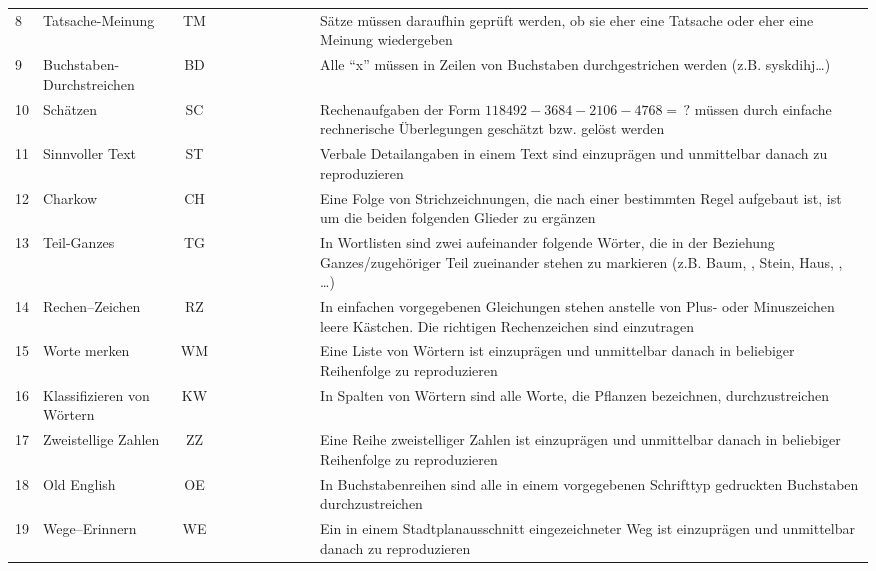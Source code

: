 \documentclass[11pt, twoside, a4paper]{book}		%
\begin{document}
\begin{sidewaystable}
\begin{adjustbox}{width=\textwidth,totalheight=.9\textheight,keepaspectratio}
\begin{threeparttable}
\begin{tabular}{l l c c c c p{.0001cm} c c c p{20cm}}
				8				&	Tatsache-Meinung		&	TM			&	\checkmark	&&&&\checkmark&&& Sätze müssen daraufhin geprüft werden, ob sie eher eine Tatsache oder eher eine Meinung wiedergeben\\
				9				&	Buchstaben-Durchstreichen&	BD			&&	\checkmark	&&&&&\checkmark& Alle \enquote{x} müssen in Zeilen von Buchstaben durchgestrichen werden (z.B. sys\cancel{x}kdihj\cancel{x}\ldots)\\
				10				&	Schätzen				&	SC			&	\checkmark	&&&&&\checkmark&& Rechenaufgaben der Form $118492-3684-2106-4768=\,?$ müssen durch einfache rechnerische Überlegungen geschätzt bzw. gelöst werden\\
				11				&	Sinnvoller Text			&	ST			&&&	\checkmark	&&\checkmark&&& Verbale Detailangaben in einem Text sind einzuprägen und unmittelbar danach zu reproduzieren\\
				12				&	Charkow					&	CH			&	\checkmark	&&&&&&\checkmark& Eine Folge von Strichzeichnungen, die nach einer bestimmten Regel aufgebaut ist, ist um die beiden folgenden Glieder zu ergänzen\\
				13				&	Teil-Ganzes				&	TG			&&	\checkmark	&&&\checkmark&&& In Wortlisten sind zwei aufeinander folgende Wörter, die in der Beziehung Ganzes/zugehöriger Teil zueinander stehen zu markieren (z.B. Baum, \cancel{Blatt}, Stein, Haus, \cancel{Dach}, \ldots)\\
				14				&	Rechen--Zeichen			&	RZ			&&	\checkmark	&&&&\checkmark&& In  einfachen vorgegebenen Gleichungen stehen anstelle von Plus- oder Minuszeichen leere Kästchen. Die richtigen Rechenzeichen sind einzutragen\\
				15				&	Worte merken			&	WM			&&&	\checkmark	&&\checkmark&&& Eine Liste von Wörtern ist einzuprägen und unmittelbar danach in beliebiger Reihenfolge zu reproduzieren\\ 
				16				&	Klassifizieren von Wörtern&	KW			&&	\checkmark	&&&\checkmark&&& In Spalten von Wörtern sind alle Worte, die Pflanzen bezeichnen, durchzustreichen\\
				17				&	Zweistellige Zahlen		&	ZZ			&&&	\checkmark	&&&\checkmark&& Eine Reihe zweistelliger Zahlen ist einzuprägen und unmittelbar danach in beliebiger Reihenfolge zu reproduzieren\\
				18				&	Old English				&	OE			&&	\checkmark	&&&&&\checkmark& In Buchstabenreihen sind alle in einem vorgegebenen Schrifttyp gedruckten Buchstaben durchzustreichen\\
				19				&	Wege--Erinnern			&	WE			&&&	\checkmark	&&&&\checkmark& Ein in einem Stadtplanausschnitt eingezeichneter Weg ist einzuprägen und unmittelbar danach zu reproduzieren\\
				

\end{tabular}
\end{threeparttable}
\end{adjustbox}
\end{sidewaystable}
\end{document}
